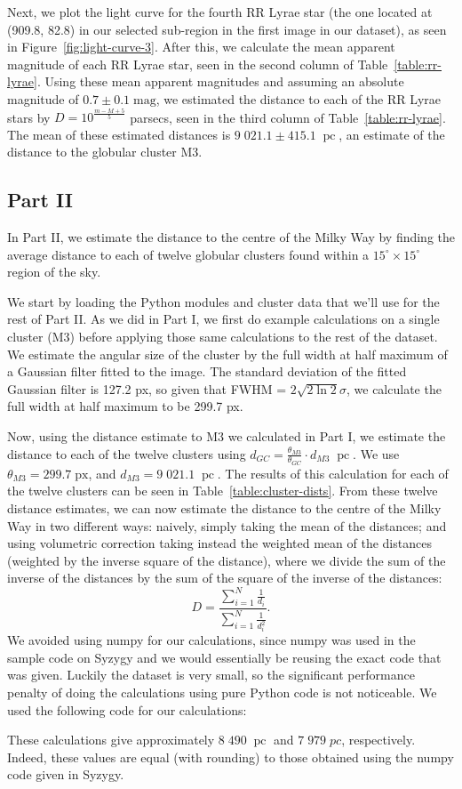 \documentclass[11pt]{article}
\DeclareMathOperator{\pc}{pc}
\begin{document}
Next, we plot the light curve for the fourth RR Lyrae star (the one located at (909.8, 82.8) in our selected sub-region in the first image in our dataset), as seen in Figure~\ref{fig:light-curve-3}.
After this, we calculate the mean apparent magnitude of each RR Lyrae star, seen in the second column of Table~\ref{table:rr-lyrae}.
Using these mean apparent magnitudes and assuming an absolute magnitude of $0.7 \pm 0.1\;\textrm{mag}$, we estimated the distance to each of the RR Lyrae stars by $D = 10 ^ \frac{m - M + 5}{5}$ parsecs, seen in the third column of Table~\ref{table:rr-lyrae}.
The mean of these estimated distances is $9\;021.1 \pm 415.1\;\pc$, an estimate of the distance to the globular cluster M3.

\subsection*{Part II}
In Part II, we estimate the distance to the centre of the Milky Way by finding the average distance to each of twelve globular clusters found within a $15^\circ \times 15^\circ$ region of the sky.


We start by loading the Python modules and cluster data that we'll use for the rest of Part II.
As we did in Part I, we first do example calculations on a single cluster (M3) before applying those same calculations to the rest of the dataset.
We estimate the angular size of the cluster by the full width at half maximum of a Gaussian filter fitted to the image.
The standard deviation of the fitted Gaussian filter is 127.2 px, so given that FWHM = $2 \sqrt{2 \ln{2}} \sigma$, we calculate the full width at half maximum to be 299.7 px.

Now, using the distance estimate to M3 we calculated in Part I, we estimate the distance to each of the twelve clusters using $d_{GC} = \frac{\theta_{M3}}{\theta_{GC}} \cdot d_{M3}\;\pc$.
We use $\theta_{M3} = 299.7\;\textrm{px}$, and $d_{M3} = 9\;021.1\;\pc$.
The results of this calculation for each of the twelve clusters can be seen in Table~\ref{table:cluster-dists}.
From these twelve distance estimates, we can now estimate the distance to the centre of the Milky Way in two different ways: naively, simply taking the mean of the distances; and using volumetric correction taking instead the weighted mean of the distances (weighted by the inverse square of the distance), where we divide the sum of the inverse of the distances by the sum of the square of the inverse of the distances:
\[D = \frac{\sum_{i=1}^N \frac{1}{d_i}}{\sum_{i=1}^N \frac{1}{d_i^2}}.\]
We avoided using numpy for our calculations, since numpy was used in the sample code on Syzygy and we would essentially be reusing the exact code that was given.
Luckily the dataset is very small, so the significant performance penalty of doing the calculations using pure Python code is not noticeable.
We used the following code for our calculations:

These calculations give approximately $8\;490\;\pc$ and $7\;979\;pc$, respectively. Indeed, these values are equal (with rounding) to those obtained using the numpy code given in Syzygy.
\end{document}

